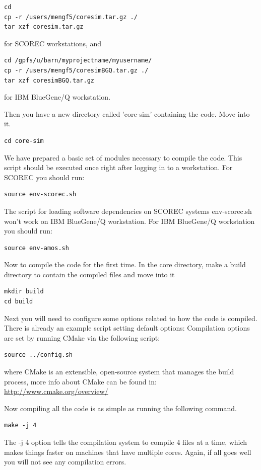 \documentclass{article}
\begin{document}
\begin{lstlisting}
cd
cp -r /users/mengf5/coresim.tar.gz ./
tar xzf coresim.tar.gz
\end{lstlisting}
for SCOREC workstations, and 
\begin{lstlisting}
cd /gpfs/u/barn/myprojectname/myusername/
cp -r /users/mengf5/coresimBGQ.tar.gz ./
tar xzf coresimBGQ.tar.gz
\end{lstlisting}
for IBM BlueGene/Q workstation.

Then you have a new directory called 'core-sim' containing the code. Move into it.
\begin{lstlisting}
cd core-sim
\end{lstlisting}

We have prepared a basic set of modules necessary to compile the code. This script should be executed once right after logging in to a workstation. For SCOREC you should run:
\begin{lstlisting}
source env-scorec.sh
\end{lstlisting}
The script for loading software dependencies on SCOREC systems env-scorec.sh won't work on IBM BlueGene/Q workstation. For IBM BlueGene/Q workstation you should run:
\begin{lstlisting}
source env-amos.sh
\end{lstlisting}

Now to compile the code for the first time. In the core directory, make a build directory to contain the compiled files and move into it
\begin{lstlisting} 
mkdir build
cd build
\end{lstlisting}

Next you will need to configure some options related to how the code is compiled. There is already an example script setting default options:
Compilation options are set by running CMake via the following script:
\begin{lstlisting}
source ../config.sh
\end{lstlisting}
where CMake is an extensible, open-source system that manages the build process, more info about CMake can be found in:\\
\url{http://www.cmake.org/overview/}

Now compiling all the code is as simple as running the following command.
\begin{lstlisting}
make -j 4
\end{lstlisting}

The -j 4 option tells the compilation system to compile 4 files at a time, which makes things faster on machines that have multiple cores.
Again, if all goes well you will not see any compilation errors.
\end{document}
